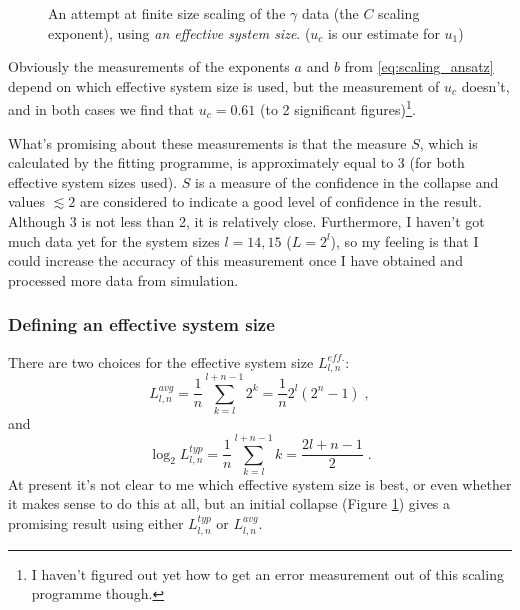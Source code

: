 \documentclass[a4paper,10pt]{article}
\newcommand{\fref}[1]{Figure \ref{#1}}
\begin{document}
\begin{figure}[ht!]
 \centering
 \caption{An attempt at finite size scaling of the $\gamma$ data (the $C$ scaling exponent), using \emph{an effective system size}. ($u_c$ is our estimate for $u_1$) }
 \label{fig:C-u_4set_collapse}
\end{figure}
Obviously the measurements of the exponents $a$ and $b$ from \eqref{eq:scaling_ansatz} depend on which effective system size is used, but the measurement of $u_c$ doesn't, and in both cases we find that $u_c = 0.61$ (to 2 significant figures)\footnote{I haven't figured out yet how to get an error measurement out of this scaling programme though.}.

What's promising about these measurements is that the measure $S$, which is calculated by the fitting programme, is approximately equal to 3 (for both effective system sizes used). $S$ is a measure of the confidence in the collapse \cite{Houdayer2004} and values $\lesssim 2$ are considered to indicate a good level of confidence in the result. Although 3 is not less than 2, it is relatively close. Furthermore, I haven't got much data yet for the system sizes $l=14,15$ ($L=2^l$), so my feeling is that I could increase the accuracy of this measurement once I have obtained and processed more data from simulation.

\subsubsection{Defining an effective system size}\label{sec:L_eff}

There are two choices for the effective system size $L^{eff.}_{l,n}$:
\begin{equation}
  L^{avg}_{l,n} = \frac{1}{n} \sum_{k=l}^{l+n-1} 2^k = \frac{1}{n} 2^l (2^n -1) \;,
\end{equation}
and
\begin{equation}
  \log_2 L^{typ}_{l,n} = \frac{1}{n} \sum_{k=l}^{l+n-1} k = \frac{2l + n - 1}{2} \;.
\end{equation}
At present it's not clear to me which effective system size is best, or even whether it makes sense to do this at all, but an initial collapse (\fref{fig:C-u_4set_collapse}) gives a promising result using either $L^{typ}_{l,n}$ or $L^{avg}_{l,n}$. 
\end{document}
